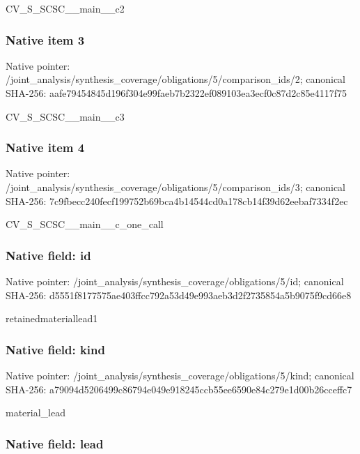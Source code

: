 \documentclass[10pt,a4paper]{article}
\begin{document}
CV\_S\_SCSC\_\_main\_\_c2


\subsubsection{Native item 3}


Native pointer: /joint\_analysis/synthesi\allowbreak{}s\_coverage/obligations/5\allowbreak{}/comparison\_ids/2; canonical SHA-256: aafe79454845d196f304e99f\allowbreak{}aeb7b2322ef089103ea3ecf0\allowbreak{}c87d2c85e4117f75


CV\_S\_SCSC\_\_main\_\_c3


\subsubsection{Native item 4}


Native pointer: /joint\_analysis/synthesi\allowbreak{}s\_coverage/obligations/5\allowbreak{}/comparison\_ids/3; canonical SHA-256: 7c9fbecc240fecf199752b69\allowbreak{}bca4b14544cd0a178cb14f39\allowbreak{}d62eebaf7334f2ec


CV\_S\_SCSC\_\_main\_\_c\_one\_call


\subsubsection{Native field: id}


Native pointer: /joint\_analysis/synthesi\allowbreak{}s\_coverage/obligations/5\allowbreak{}/id; canonical SHA-256: d5551f8177575ae403ffcc79\allowbreak{}2a53d49e993aeb3d2f273585\allowbreak{}4a5b9075f9cd66e8


retainedmateriallead1


\subsubsection{Native field: kind}


Native pointer: /joint\_analysis/synthesi\allowbreak{}s\_coverage/obligations/5\allowbreak{}/kind; canonical SHA-256: a79094d5206499c86794e049\allowbreak{}e918245ccb55ee6590e84c27\allowbreak{}9e1d00b26cceffc7


material\_lead


\subsubsection{Native field: lead}
\end{document}
